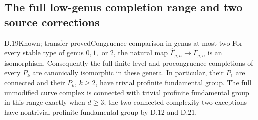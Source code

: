 \subsection{The full low-genus completion range and two source corrections}

\begin{result}{D.19}{Known; transfer proved}{Congruence comparison in genus at most two}
For every stable type of genus $0,1,$ or $2$, the natural map
$\widehat\Gamma_{g,n}\to\check\Gamma_{g,n}$
is an isomorphism. Consequently the full finite-level and procongruence completions of every $P_k$ are canonically isomorphic in these genera. In particular, their $P_1$ are connected and their $P_k$, $k\geq2$, have trivial profinite fundamental group. The full unmodified curve complex is connected with trivial profinite fundamental group in this range exactly when $d\geq3$; the two connected complexity-two exceptions have nontrivial profinite fundamental group by D.12 and D.21.
\end{result}
